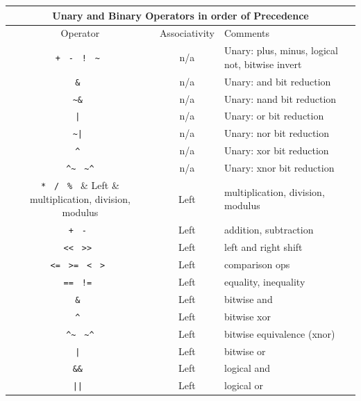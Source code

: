 \documentclass[twoside,letterpaper]{article}
\begin{document}
\begin{center}
 \begin{tabular}[t]{|c|c|l|}
  \hline
\multicolumn{3}{|c|}{Unary and Binary Operators in order of
  Precedence}\\
\hline
  Operator     & Associativity & Comments \\
  \hline
  \verb'+ ' \verb'- ' \verb'! ' \verb'~ '   & n/a   & Unary: plus, minus, logical not, bitwise invert \\
  \verb"& "                                 & n/a   & Unary: and bit reduction \\
  \verb"~& "                                & n/a   & Unary: nand bit reduction \\
  \verb"| "                                 & n/a   & Unary: or bit reduction \\
  \verb"~| "                                & n/a   & Unary: nor bit reduction \\
  \verb"^ "                                 & n/a   & Unary: xor bit reduction \\
  \verb"^~ " \verb"~^"                      & n/a   & Unary: xnor bit reduction \\
  \verb"* "  \verb"/ "  \verb"% "           & Left  & multiplication, division, modulus \\
  \verb"+ "  \verb"- "                      & Left  & addition, subtraction   \\
  \verb"<< " \verb">> "                     & Left  & left and right shift  \\
  \verb"<= " \verb">= " \verb"< " \verb"> " & Left  & comparison ops  \\
  \verb"== " \verb"!= "                     & Left  & equality, inequality \\
  \verb"& "                                 & Left  & bitwise and \\
  \verb"^ "                                 & Left  & bitwise xor \\
  \verb"^~ " \verb"~^"                      & Left  & bitwise
  equivalence (xnor) \\
  \verb"| "                                 & Left  & bitwise or \\
  \verb"&& "                                & Left  & logical and \\
  \verb"|| "                                & Left  & logical or \\
  \hline
\end{tabular}
\end{center}
\end{document}
